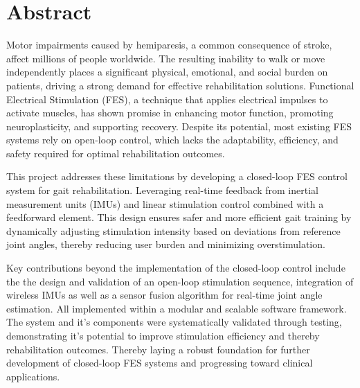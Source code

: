 
\section*{Abstract}
Motor impairments caused by hemiparesis, a common consequence of stroke, affect millions of people worldwide. The resulting inability to walk or move independently places a significant physical, emotional, and social burden on patients, driving a strong demand for effective rehabilitation solutions. Functional Electrical Stimulation (FES), a technique that applies electrical impulses to activate muscles, has shown promise in enhancing motor function, promoting neuroplasticity, and supporting recovery. Despite its potential, most existing FES systems rely on open-loop control, which lacks the adaptability, efficiency, and safety required for optimal rehabilitation outcomes.

This project addresses these limitations by developing a closed-loop FES control system for gait rehabilitation. Leveraging real-time feedback from inertial measurement units (IMUs) and linear stimulation control combined with a feedforward element. This design ensures safer and more efficient gait training by dynamically adjusting stimulation intensity based on deviations from reference joint angles, thereby reducing user burden and minimizing overstimulation.

Key contributions beyond the implementation of the closed-loop control include the the design and validation of an open-loop stimulation sequence, integration of wireless IMUs as well as a sensor fusion algorithm for real-time joint angle estimation. All implemented within a modular and scalable software framework. The system and it's components were systematically validated through testing, demonstrating it's potential to improve stimulation efficiency and thereby rehabilitation outcomes. Thereby laying a robust foundation for further development of closed-loop FES systems and progressing toward clinical applications.

